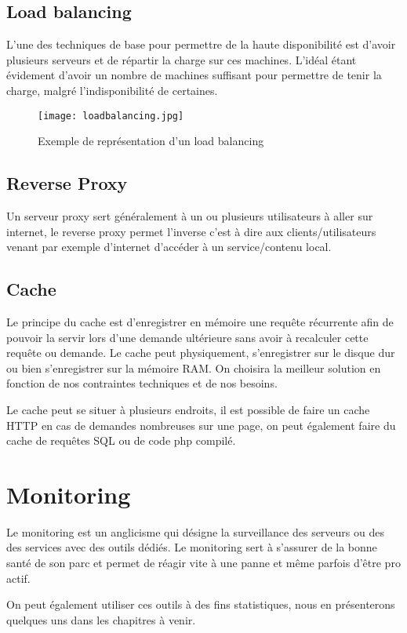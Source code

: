 \documentclass[a4paper,10pt,one side,titlepage]{report}
\begin{document}
\subsection{Load balancing}
L'une des techniques de base pour permettre de la haute disponibilité est d'avoir
plusieurs serveurs et de répartir la charge sur ces machines. L'idéal étant évidement
d'avoir un nombre de machines suffisant pour permettre de tenir la charge, malgré
l'indisponibilité de certaines.

\begin{figure}[H]
    \centering
    \texttt{[image: loadbalancing.jpg]}
    \label{fig:loadbalancing}
    \caption{Exemple de représentation d'un load balancing}
\end{figure}


\subsection{Reverse Proxy}
Un serveur proxy sert généralement à un ou plusieurs utilisateurs à aller sur internet,
le reverse proxy permet l'inverse c'est à dire aux clients/utilisateurs venant par 
exemple d'internet d'accéder à un service/contenu local.

\subsection{Cache}
Le principe du cache est d'enregistrer en mémoire une requête récurrente afin de 
pouvoir la servir lors d'une demande ultérieure sans avoir à recalculer cette requête
ou demande. Le cache peut physiquement, s'enregistrer sur le disque dur ou bien 
s'enregistrer sur la mémoire RAM. On choisira la meilleur solution en fonction de
nos contraintes techniques et de nos besoins.

Le cache peut se situer à plusieurs endroits, il est possible de faire un cache 
HTTP en cas de demandes nombreuses sur une page, on peut également faire du cache
de requêtes SQL ou de code php compilé.

\section{Monitoring}
Le monitoring est un anglicisme qui désigne la surveillance des serveurs ou des 
des services avec des outils dédiés. Le monitoring sert à s'assurer de la bonne 
santé de son parc et permet de réagir vite à une panne et même parfois d'être pro actif.

On peut également utiliser ces outils à des fins statistiques, nous en présenterons
quelques uns dans les chapitres à venir.
\end{document}
